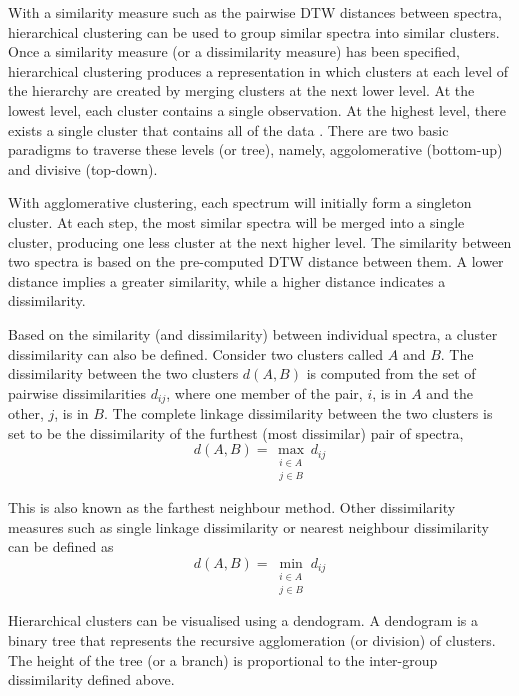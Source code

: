 With a similarity measure such as the pairwise DTW distances between spectra, hierarchical clustering can be used to group similar spectra into similar clusters. Once a similarity measure (or a dissimilarity measure) has been specified, hierarchical clustering produces a representation in which clusters at each level of the hierarchy are created by merging clusters at the next lower level. At the lowest level, each cluster contains a single observation. At the highest level, there exists a single cluster that contains all of the data \citep{hastie2009elements}. There are two basic paradigms to traverse these levels (or tree), namely, aggolomerative (bottom-up) and divisive (top-down). 

With agglomerative clustering, each spectrum will initially form a singleton cluster. At each step, the most similar spectra will be merged into a single cluster, producing one less cluster at the next higher level. The similarity between two spectra is based on the pre-computed DTW distance between them. A lower distance implies a greater similarity, while a higher distance indicates a dissimilarity.  

Based on the similarity (and dissimilarity) between individual spectra, a cluster dissimilarity can also be defined. Consider two clusters called $A$ and $B$. The dissimilarity between the two clusters $d(A,B)$ is computed from the set of pairwise dissimilarities $d_{ij}$, where one member of the pair, $i$, is in $A$ and the other, $j$, is in $B$. The complete linkage dissimilarity between the two clusters is set to be the dissimilarity of the furthest (most dissimilar) pair of spectra,
\begin{equation}
    d(A,B) = \max_{\substack{i \in A \\ j \in B}} d_{ij}
\end{equation}

This is also known as the farthest neighbour method. Other dissimilarity measures such as single linkage dissimilarity or nearest neighbour dissimilarity can be defined as
\begin{equation}
    d(A,B) = \min_{\substack{i \in A \\ j \in B}} d_{ij}
\end{equation}

Hierarchical clusters can be visualised using a dendogram. A dendogram is a binary tree that represents the recursive agglomeration (or division) of clusters. The height of the tree (or a branch) is proportional to the inter-group dissimilarity defined above. 

